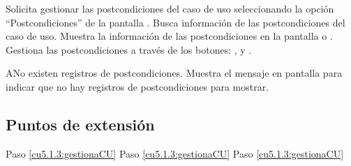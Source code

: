  \begin{UCtrayectoria}
    \UCpaso[\UCactor] Solicita gestionar las postcondiciones del caso de uso seleccionando la opción ``Postcondiciones'' de la pantalla .
    \UCpaso[\UCsist] Busca información de las postcondiciones del caso de uso. 
    \UCpaso[\UCsist] Muestra la información de las postcondiciones en la pantalla  o . 
    \UCpaso[\UCactor] Gestiona las postcondiciones a través de los botones: \btnAgregar, \btnEditar y \btnEliminar. \label{cu5.1.3:gestionaCU}
 \end{UCtrayectoria}
 
 \begin{UCtrayectoriaA}{A}{No existen registros de postcondiciones.}
    \UCpaso[\UCsist] Muestra el mensaje  en pantalla  
    para indicar que no hay registros de postcondiciones para mostrar.
 \end{UCtrayectoriaA}
 

\subsection{Puntos de extensión}

	{Paso \ref{cu5.1.3:gestionaCU}}
	{}
	{Paso \ref{cu5.1.3:gestionaCU}}
	{}
	{Paso \ref{cu5.1.3:gestionaCU}}
	{}
  